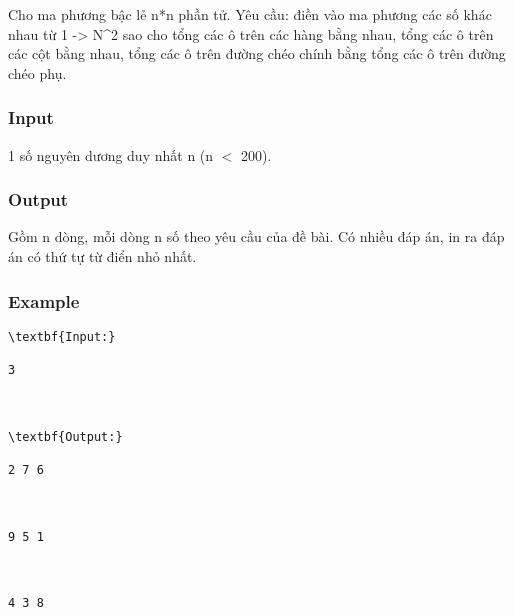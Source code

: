 

Cho ma phương bậc lẻ n*n phần tử. Yêu cầu: điền vào ma phương các số khác nhau từ 1 -> N\textasciicircum2 sao cho tổng các ô trên các hàng bằng nhau, tổng các ô trên các cột bằng nhau, tổng các ô trên đường chéo chính bằng tổng các ô trên đường chéo phụ.

\subsubsection{Input}

1 số nguyên dương duy nhất n (n $<$ 200).

\subsubsection{Output}

Gồm n dòng, mỗi dòng n số theo yêu cầu của đề bài. Có nhiều đáp án, in ra đáp án có thứ tự từ điển nhỏ nhất.

\subsubsection{Example}
\begin{verbatim}
\textbf{Input:}

3



\textbf{Output:}

2 7 6



9 5 1



4 3 8

\end{verbatim}
